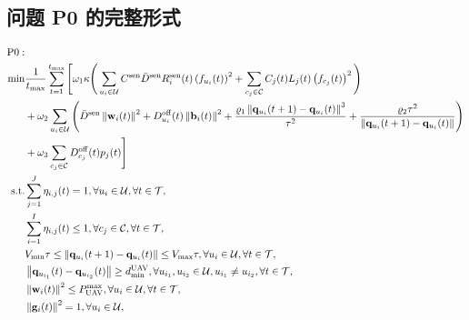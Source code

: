 \documentclass[11pt,a4paper]{ctexart}
\begin{document}
\subsection{问题 P0 的完整形式}
\begingroup\small
\begin{align}
    \mathrm{P0}:&
    \notag\\
    \min&
    \frac{1}{t_{\max}}
    \sum_{t=1}^{t_{\max}}
    \Bigg[
    \omega_{1}\kappa
    \Bigg(
        \sum_{u_i\in\mathcal{U}}
        C^{\mathrm{sen}}\bar{D}^{\mathrm{sen}}
        R_i^{\mathrm{sen}}(t)
        \left(f_{u_i}(t)\right)^2
        +\sum_{c_j\in\mathcal{C}}
        C_j(t)L_j(t)
        \left(f_{c_j}(t)\right)^2
    \Bigg)
    \notag\\
    &
    +\omega_{2}
    \sum_{u_i\in\mathcal{U}}
    \Bigg(
        \bar{D}^{\mathrm{sen}}
        \left\|\mathbf{w}_i(t)\right\|^2
        +D_{u_i}^{\mathrm{off}}(t)
        \left\|\mathbf{b}_i(t)\right\|^2
        +\frac{
            \varrho_{1}
            \left\|
                \mathbf{q}_{u_i}(t+1)-\mathbf{q}_{u_i}(t)
            \right\|^3
        }{\tau^2}
        +\frac{
            \varrho_{2}\tau^2
        }{
            \left\|
                \mathbf{q}_{u_i}(t+1)-\mathbf{q}_{u_i}(t)
            \right\|
        }
    \Bigg)
    \notag\\
    &
    +\omega_{3}
    \sum_{c_j\in\mathcal{C}}
    D_{c_j}^{\mathrm{off}}(t)p_j(t)
    \Bigg]
    \notag\\
    \text{s.t.}&
    \sum_{j=1}^{J}\eta_{i,j}(t)=1,
    \forall u_i\in\mathcal{U},
    \forall t\in\mathcal{T},
    \notag\\
    &
    \sum_{i=1}^{I}\eta_{i,j}(t)\leq1,
    \forall c_j\in\mathcal{C},
    \forall t\in\mathcal{T},
    \notag\\
    &
    V_{\min}\tau
    \leq
    \left\|
        \mathbf{q}_{u_i}(t+1)-\mathbf{q}_{u_i}(t)
    \right\|
    \leq V_{\max}\tau,
    \forall u_i\in\mathcal{U},
    \forall t\in\mathcal{T},
    \notag\\
    &
    \left\|
        \mathbf{q}_{u_{i_1}}(t)-\mathbf{q}_{u_{i_2}}(t)
    \right\|
    \geq d_{\min}^{\mathrm{UAV}},
    \forall u_{i_1},u_{i_2}\in\mathcal{U},
    u_{i_1}\neq u_{i_2},
    \forall t\in\mathcal{T},
    \notag\\
    &
    \left\|\mathbf{w}_i(t)\right\|^2
    \leq P_{\mathrm{UAV}}^{\max},
    \forall u_i\in\mathcal{U},
    \forall t\in\mathcal{T},
    \notag\\
    &
    \left\|\mathbf{g}_i(t)\right\|^2=1,
    \forall u_i\in\mathcal{U},

\end{align}
\end{document}

